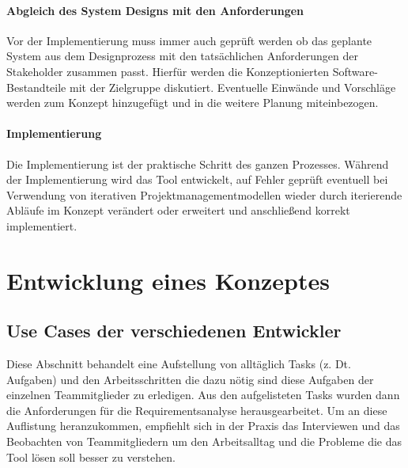 \documentclass[pagesize, paper=a4, fontsize=12pt, titlepage=true, headings=small, headnosepline, abstractoff, liststotoc, nochapterprefix, plainheadsepline, twoside]{scrreprt}
\begin{document}
\subsubsection{Abgleich des System Designs mit den Anforderungen}
Vor der Implementierung muss immer auch geprüft werden ob das geplante System aus dem Designprozess mit den tatsächlichen Anforderungen der Stakeholder zusammen passt. Hierfür werden die Konzeptionierten Software-Bestandteile mit der Zielgruppe diskutiert. Eventuelle Einwände und Vorschläge werden zum Konzept hinzugefügt und in die weitere Planung miteinbezogen.

\subsubsection{Implementierung}
Die Implementierung ist der praktische Schritt des ganzen Prozesses. Während der Implementierung wird das Tool entwickelt, auf Fehler geprüft eventuell bei Verwendung von iterativen Projektmanagementmodellen wieder durch iterierende Abläufe im Konzept verändert oder erweitert und anschließend korrekt implementiert.


\chapter{Entwicklung eines Konzeptes}

\section{Use Cases der verschiedenen Entwickler}
Diese Abschnitt behandelt eine Aufstellung von alltäglich Tasks (z. Dt. Aufgaben) und den Arbeitsschritten die dazu nötig sind diese Aufgaben der einzelnen Teammitglieder zu erledigen. Aus den aufgelisteten Tasks wurden dann die Anforderungen für die Requirementsanalyse herausgearbeitet. Um an diese Auflistung heranzukommen, empfiehlt sich in der Praxis das Interviewen und das Beobachten von Teammitgliedern um den Arbeitsalltag und die Probleme die das Tool lösen soll besser zu verstehen.
\end{document}

